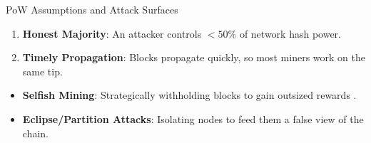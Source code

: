 \documentclass[aspectratio=169]{beamer}
\begin{document}
\begin{frame}{PoW Assumptions and Attack Surfaces}
    \begin{tcolorbox}[enhanced, colback=d2s.fg!30, colframe=black, fonttitle=\bfseries, title={Core Assumptions for PoW Security}, rounded corners, drop shadow]
        \begin{enumerate}
            \item \textbf{Honest Majority}: An attacker controls $<50\%$ of network hash power.
            \item \textbf{Timely Propagation}: Blocks propagate quickly, so most miners work on the same tip.
        \end{enumerate}
    \end{tcolorbox}
    \begin{tcolorbox}[enhanced, colback=red!20, colframe=red!75!black, fonttitle=\bfseries, title={When Assumptions Weaken, Attacks Emerge}, rounded corners, drop shadow]
        \begin{itemize}
            \item \textbf{Selfish Mining}: Strategically withholding blocks to gain outsized rewards \cite{eyal_majority_2014}.
            \item \textbf{Eclipse/Partition Attacks}: Isolating nodes to feed them a false view of the chain.
        \end{itemize}
    \end{tcolorbox}
\end{frame}
\end{document}
